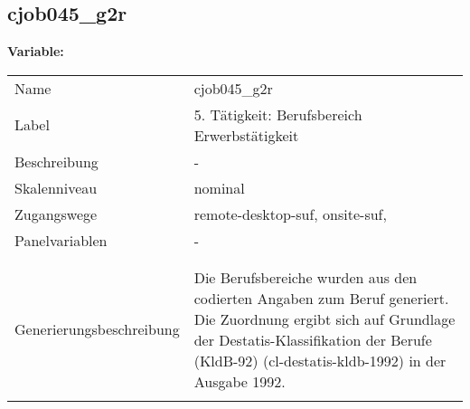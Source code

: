 	
	
	\subsection{cjob045\_g2r}
	\label{subSection:cjob045_g2r}

	\noindent\textbf{Variable:}\\
		\begin{tabular}{lL{11.3cm}}
			\label{tableVariable:cjob045_g2r}
			Name & cjob045\_g2r \\
			Label & 5. Tätigkeit: Berufsbereich Erwerbstätigkeit \\
			Beschreibung & - \\
			Skalenniveau & nominal \\
			Zugangswege &
				remote-desktop-suf,
				onsite-suf,
 \\
			Panelvariablen & -
			 \\
			 \\
 \\
					Generierungsbeschreibung & Die Berufsbereiche wurden aus den codierten Angaben zum Beruf generiert. Die Zuordnung ergibt sich auf Grundlage der Destatis-Klassifikation der Berufe (KldB-92) (cl-destatis-kldb-1992) in der Ausgabe 1992. 
				 \\	
			 \\
		\end{tabular}






